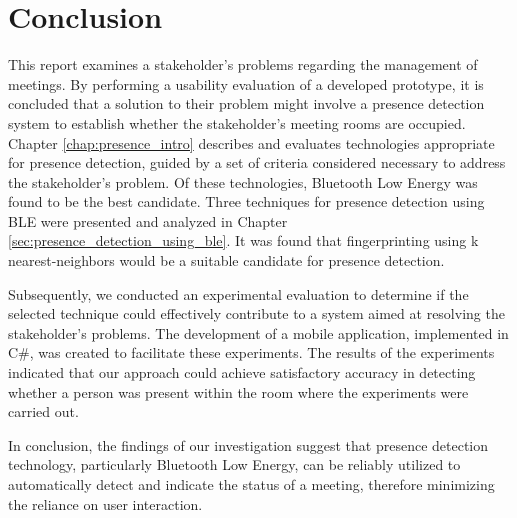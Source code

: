 \chapter{Conclusion}
This report examines a stakeholder's problems regarding the management of meetings. 
By performing a usability evaluation of a developed prototype, it is concluded that a solution to their problem might involve a presence detection system to establish whether the stakeholder's meeting rooms are occupied. 
Chapter \ref{chap:presence_intro} describes and evaluates technologies appropriate for presence detection, guided by a set of criteria considered necessary to address the stakeholder's problem. 
Of these technologies, Bluetooth Low Energy was found to be the best candidate. 
Three techniques for presence detection using BLE were presented and analyzed in Chapter \ref{sec:presence_detection_using_ble}. 
It was found that fingerprinting using k nearest-neighbors would be a suitable candidate for presence detection.

Subsequently, we conducted an experimental evaluation to determine if the selected technique could effectively contribute to a system aimed at resolving the stakeholder's problems. 
The development of a mobile application, implemented in C\#, was created to facilitate these experiments. 
The results of the experiments indicated that our approach could achieve satisfactory accuracy in detecting whether a person was present within the room where the experiments were carried out.

In conclusion, the findings of our investigation suggest that presence detection technology, particularly Bluetooth Low Energy, can be reliably utilized to automatically detect and indicate the status of a meeting, therefore minimizing the reliance on user interaction.